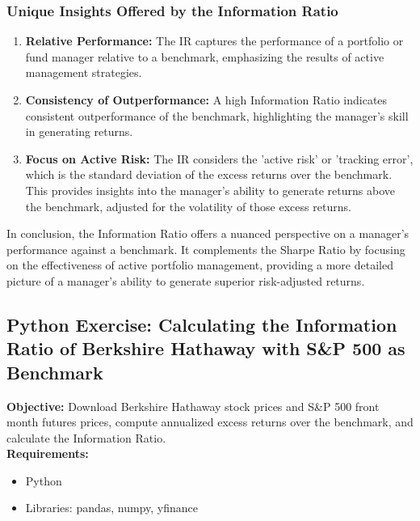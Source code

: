 \documentclass{article}
\begin{document}
\subsubsection{Unique Insights Offered by the Information Ratio}

\begin{enumerate}
    \item \textbf{Relative Performance:}
    The IR captures the performance of a portfolio or fund manager relative to a benchmark, emphasizing the results of active management strategies.

    \item \textbf{Consistency of Outperformance:}
    A high Information Ratio indicates consistent outperformance of the benchmark, highlighting the manager's skill in generating returns.

    \item \textbf{Focus on Active Risk:}
    The IR considers the 'active risk' or 'tracking error', which is the standard deviation of the excess returns over the benchmark. This provides insights into the manager’s ability to generate returns above the benchmark, adjusted for the volatility of those excess returns.
\end{enumerate}

In conclusion, the Information Ratio offers a nuanced perspective on a manager's performance against a benchmark. It complements the Sharpe Ratio by focusing on the effectiveness of active portfolio management, providing a more detailed picture of a manager's ability to generate superior risk-adjusted returns. \\

\subsection{Python Exercise: Calculating the Information Ratio of Berkshire Hathaway with S\&P 500 as Benchmark}

\textbf{Objective:} Download Berkshire Hathaway stock prices and S\&P 500 front month futures prices, compute annualized excess returns over the benchmark, and calculate the Information Ratio. \\

\textbf{Requirements:}
\begin{itemize}
    \item Python
    \item Libraries: pandas, numpy, yfinance
\end{itemize}
\end{document}
